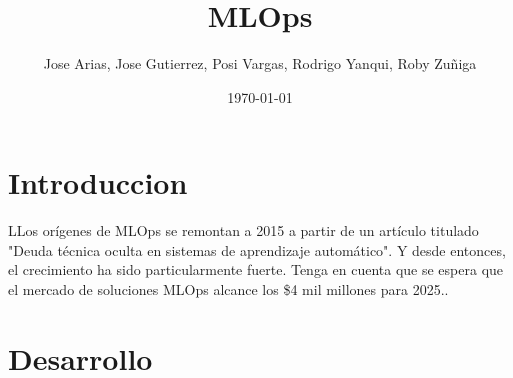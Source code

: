\documentclass[twoside,twocolumn]{article}
\title{MLOps}
\author{Jose Arias, Jose Gutierrez, Posi Vargas, Rodrigo Yanqui, Roby Zuñiga}
\date{\today}
\begin{document}
\maketitle


\section{Introduccion}
\lettrine[nindent=0em,lines=3]{L}Los orígenes de MLOps se remontan a 2015 a partir de un artículo titulado "Deuda técnica oculta en sistemas de aprendizaje automático". Y desde entonces, el crecimiento ha sido particularmente fuerte. Tenga en cuenta que se espera que el mercado de soluciones MLOps alcance los \$4 mil millones para 2025..


\section{Desarrollo}
\end{document}
